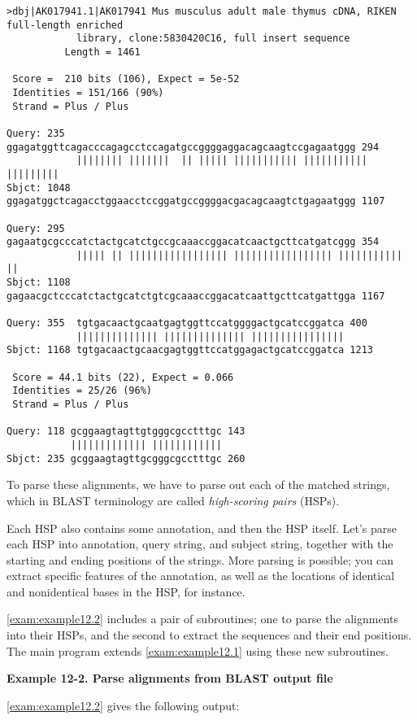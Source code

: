 \begin{lstlisting}
>dbj|AK017941.1|AK017941 Mus musculus adult male thymus cDNA, RIKEN
full-length enriched
            library, clone:5830420C16, full insert sequence
          Length = 1461

 Score =  210 bits (106), Expect = 5e-52
 Identities = 151/166 (90%)
 Strand = Plus / Plus

Query: 235  ggagatggttcagacccagagcctccagatgccggggaggacagcaagtccgagaatggg 294
            |||||||| |||||||  || ||||| ||||||||||| ||||||||||| |||||||||
Sbjct: 1048 ggagatggctcagacctggaacctccggatgccggggacgacagcaagtctgagaatggg 1107

Query: 295  gagaatgcgcccatctactgcatctgccgcaaaccggacatcaactgcttcatgatcggg 354
            ||||| || ||||||||||||||||| ||||||||||||||||| ||||||||||| ||
Sbjct: 1108 gagaacgctcccatctactgcatctgtcgcaaaccggacatcaattgcttcatgattgga 1167

Query: 355  tgtgacaactgcaatgagtggttccatggggactgcatccggatca 400
            |||||||||||||| |||||||||||||| ||||||||||||||||
Sbjct: 1168 tgtgacaactgcaacgagtggttccatggagactgcatccggatca 1213

 Score = 44.1 bits (22), Expect = 0.066
 Identities = 25/26 (96%)
 Strand = Plus / Plus

Query: 118 gcggaagtagttgtgggcgcctttgc 143
           ||||||||||||| ||||||||||||
Sbjct: 235 gcggaagtagttgcgggcgcctttgc 260
\end{lstlisting}

To parse these alignments, we have to parse out each of the matched strings, which in BLAST terminology are called \textit{high-scoring pairs} (HSPs).

Each HSP also contains some annotation, and then the HSP itself. Let's parse each HSP into annotation, query string, and subject string, together with the starting and ending positions of the strings. More parsing is possible; you can extract specific features of the annotation, as well as the locations of identical and nonidentical bases in the HSP, for instance.

\autoref{exam:example12.2} includes a pair of subroutines; one to parse the alignments into their HSPs, and the second to extract the sequences and their end positions. The main program extends \autoref{exam:example12.1} using these new subroutines. 

\textbf{Example 12-2. Parse alignments from BLAST output file}


\autoref{exam:example12.2} gives the following output:

